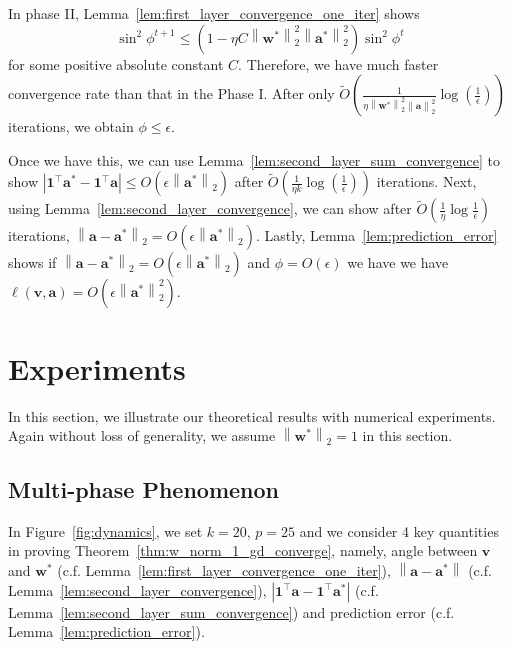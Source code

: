 \documentclass{article}
\newcommand{\firstlayer}{w}
\newcommand{\firstlayerWN}{v}
\newcommand{\secondlayer}{a}
\newcommand{\vect}[1]{\mathbf{#1}}
\newcommand{\norm}[1]{\left\|#1\right\|}
\newcommand{\abs}[1]{\left|#1\right|}
\begin{document}
In phase II, Lemma~\ref{lem:first_layer_convergence_one_iter} shows \[
\sin^2\phi^{t+1} \le \left(1-\eta C \norm{\vect{\firstlayer}^*}_2^2\norm{\vect{\secondlayer}^*}_2^2\right)\sin^2\phi^t
\] for some positive absolute constant $C$.
Therefore, we have much faster convergence rate than that in the Phase I.
After only $\widetilde{O}\left(\frac{1}{\eta \norm{\vect{\firstlayer}^*}_2^2\norm{\vect{\secondlayer}}_2^2}\log\left(\frac{1}{\epsilon}\right)\right)$ iterations, we obtain $\phi \le \epsilon$.

Once we have this, we can use  Lemma~\ref{lem:second_layer_sum_convergence} to show $\abs{\vect{1}^\top \vect{\secondlayer}^*-\vect{1}^\top \vect{\secondlayer}} \le O\left(\epsilon \norm{\vect{\secondlayer}^*}_2\right)$ after $\widetilde{O}(\frac{1}{\eta k}\log\left(\frac{1}{\epsilon}\right))$ iterations. 
Next, using Lemma~\ref{lem:second_layer_convergence}, we can show after $\widetilde{O}\left(\frac{1}{\eta}\log\frac{1}{\epsilon}\right)$ iterations, $\norm{\vect{\secondlayer}-\vect{\secondlayer}^*}_2 = O\left(\epsilon\norm{\vect{\secondlayer}^*}_2\right)$.
Lastly, 
Lemma~\ref{lem:prediction_error} shows if $\norm{\vect{\secondlayer}-\vect{\secondlayer}^*}_2 = O\left(\epsilon\norm{\vect{\secondlayer}^*}_2\right)$ and $\phi= O\left( \epsilon\right)$ we have we have $\ell\left(\vect{\firstlayerWN},\vect{\secondlayer}\right) = O\left(\epsilon \norm{\vect{\secondlayer}^*}_2^2\right)$.



\section{Experiments}
\label{sec:exp}
In this section, we illustrate our theoretical results with numerical experiments.
Again without loss of generality, we assume $\norm{\vect{\firstlayer}^*}_2=1$ in this section.

\subsection{Multi-phase Phenomenon}
In Figure~\ref{fig:dynamics}, we set $k=20$, $p=25$ and we consider 4 key quantities in proving Theorem~\ref{thm:w_norm_1_gd_converge}, namely, angle between $\vect{\firstlayerWN}$ and $\vect{\firstlayer}^*$ (c.f. Lemma~\ref{lem:first_layer_convergence_one_iter}), $\norm{\vect{\secondlayer}-\vect{\secondlayer}^*}$ (c.f. Lemma~\ref{lem:second_layer_convergence}), $\abs{\vect{1}^\top \vect{\secondlayer}-\vect{1}^\top \vect{\secondlayer}^*}$ (c.f. Lemma~\ref{lem:second_layer_sum_convergence}) and prediction error (c.f. Lemma~\ref{lem:prediction_error}).
\end{document}
